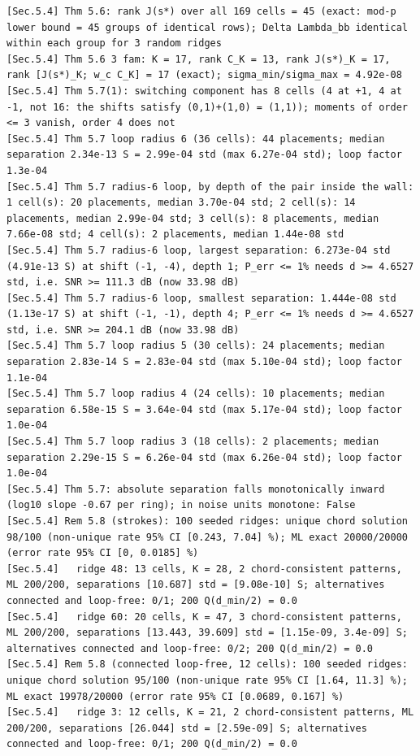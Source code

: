 \documentclass[11pt,a4paper]{article}
\theoremstyle{definition}
\theoremstyle{remark}
\begin{document}
\begin{lstlisting}[style=consolestyle]
[Sec.5.4] Thm 5.6: rank J(s*) over all 169 cells = 45 (exact: mod-p lower bound = 45 groups of identical rows); Delta Lambda_bb identical within each group for 3 random ridges
[Sec.5.4] Thm 5.6 3 fam: K = 17, rank C_K = 13, rank J(s*)_K = 17, rank [J(s*)_K; w_c C_K] = 17 (exact); sigma_min/sigma_max = 4.92e-08
[Sec.5.4] Thm 5.7(1): switching component has 8 cells (4 at +1, 4 at -1, not 16: the shifts satisfy (0,1)+(1,0) = (1,1)); moments of order <= 3 vanish, order 4 does not
[Sec.5.4] Thm 5.7 loop radius 6 (36 cells): 44 placements; median separation 2.34e-13 S = 2.99e-04 std (max 6.27e-04 std); loop factor 1.3e-04
[Sec.5.4] Thm 5.7 radius-6 loop, by depth of the pair inside the wall: 1 cell(s): 20 placements, median 3.70e-04 std; 2 cell(s): 14 placements, median 2.99e-04 std; 3 cell(s): 8 placements, median 7.66e-08 std; 4 cell(s): 2 placements, median 1.44e-08 std
[Sec.5.4] Thm 5.7 radius-6 loop, largest separation: 6.273e-04 std (4.91e-13 S) at shift (-1, -4), depth 1; P_err <= 1% needs d >= 4.6527 std, i.e. SNR >= 111.3 dB (now 33.98 dB)
[Sec.5.4] Thm 5.7 radius-6 loop, smallest separation: 1.444e-08 std (1.13e-17 S) at shift (-1, -1), depth 4; P_err <= 1% needs d >= 4.6527 std, i.e. SNR >= 204.1 dB (now 33.98 dB)
[Sec.5.4] Thm 5.7 loop radius 5 (30 cells): 24 placements; median separation 2.83e-14 S = 2.83e-04 std (max 5.10e-04 std); loop factor 1.1e-04
[Sec.5.4] Thm 5.7 loop radius 4 (24 cells): 10 placements; median separation 6.58e-15 S = 3.64e-04 std (max 5.17e-04 std); loop factor 1.0e-04
[Sec.5.4] Thm 5.7 loop radius 3 (18 cells): 2 placements; median separation 2.29e-15 S = 6.26e-04 std (max 6.26e-04 std); loop factor 1.0e-04
[Sec.5.4] Thm 5.7: absolute separation falls monotonically inward (log10 slope -0.67 per ring); in noise units monotone: False
[Sec.5.4] Rem 5.8 (strokes): 100 seeded ridges: unique chord solution 98/100 (non-unique rate 95% CI [0.243, 7.04] %); ML exact 20000/20000 (error rate 95% CI [0, 0.0185] %)
[Sec.5.4]   ridge 48: 13 cells, K = 28, 2 chord-consistent patterns, ML 200/200, separations [10.687] std = [9.08e-10] S; alternatives connected and loop-free: 0/1; 200 Q(d_min/2) = 0.0
[Sec.5.4]   ridge 60: 20 cells, K = 47, 3 chord-consistent patterns, ML 200/200, separations [13.443, 39.609] std = [1.15e-09, 3.4e-09] S; alternatives connected and loop-free: 0/2; 200 Q(d_min/2) = 0.0
[Sec.5.4] Rem 5.8 (connected loop-free, 12 cells): 100 seeded ridges: unique chord solution 95/100 (non-unique rate 95% CI [1.64, 11.3] %); ML exact 19978/20000 (error rate 95% CI [0.0689, 0.167] %)
[Sec.5.4]   ridge 3: 12 cells, K = 21, 2 chord-consistent patterns, ML 200/200, separations [26.044] std = [2.59e-09] S; alternatives connected and loop-free: 0/1; 200 Q(d_min/2) = 0.0

\end{lstlisting}
\end{document}
